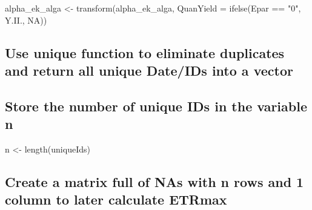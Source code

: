 \documentclass[
]{article}
\newenvironment{Shaded}{\begin{snugshade}}{\end{snugshade}}
\newcommand{\AttributeTok}[1]{\textcolor[rgb]{0.77,0.63,0.00}{#1}}
\newcommand{\ConstantTok}[1]{\textcolor[rgb]{0.00,0.00,0.00}{#1}}
\newcommand{\FunctionTok}[1]{\textcolor[rgb]{0.00,0.00,0.00}{#1}}
\newcommand{\NormalTok}[1]{#1}
\newcommand{\OtherTok}[1]{\textcolor[rgb]{0.56,0.35,0.01}{#1}}
\newcommand{\SpecialCharTok}[1]{\textcolor[rgb]{0.00,0.00,0.00}{#1}}
\newcommand{\StringTok}[1]{\textcolor[rgb]{0.31,0.60,0.02}{#1}}
\begin{document}
\begin{Shaded}
\begin{Highlighting}[]
\NormalTok{alpha\_ek\_alga }\OtherTok{\textless{}{-}} \FunctionTok{transform}\NormalTok{(alpha\_ek\_alga, }\AttributeTok{QuanYield =} \FunctionTok{ifelse}\NormalTok{(Epar }\SpecialCharTok{==} \StringTok{"0"}\NormalTok{, Y.II., }\ConstantTok{NA}\NormalTok{))  }
\end{Highlighting}
\end{Shaded}

\hypertarget{use-unique-function-to-eliminate-duplicates-and-return-all-unique-dateids-into-a-vector}{%
\subsection{Use unique function to eliminate duplicates and return all
unique Date/IDs into a
vector}\label{use-unique-function-to-eliminate-duplicates-and-return-all-unique-dateids-into-a-vector}}

\begin{Shaded}
\end{Shaded}

\hypertarget{store-the-number-of-unique-ids-in-the-variable-n}{%
\subsection{Store the number of unique IDs in the variable
n}\label{store-the-number-of-unique-ids-in-the-variable-n}}

\begin{Shaded}
\begin{Highlighting}[]
\NormalTok{n }\OtherTok{\textless{}{-}} \FunctionTok{length}\NormalTok{(uniqueIds)}
\end{Highlighting}
\end{Shaded}

\hypertarget{create-a-matrix-full-of-nas-with-n-rows-and-1-column-to-later-calculate-etrmax}{%
\subsection{Create a matrix full of NAs with n rows and 1 column to
later calculate
ETRmax}\label{create-a-matrix-full-of-nas-with-n-rows-and-1-column-to-later-calculate-etrmax}}
\end{document}
